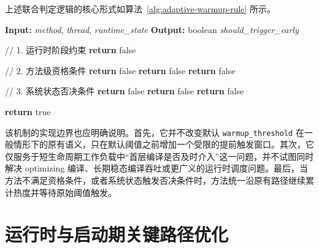 上述联合判定逻辑的核心形式如算法~\ref{alg:adaptive-warmup-rule} 所示。

\begin{algorithm}[htbp]
    \small
    \caption{方法级自适应基线 JIT 提前触发判定机制}
    \label{alg:adaptive-warmup-rule}
    \begin{algorithmic}[1]
        \State \textbf{Input:} \textit{method}, \textit{thread}, \textit{runtime\_state}
        \State \textbf{Output:} boolean \textit{should\_trigger\_early}
        
        \State // 1. 运行时阶段约束
            \State \textbf{return} false
        \EndIf
        
        \State // 2. 方法级资格条件
            \State \textbf{return} false 
        \EndIf
            \State \textbf{return} false 
        \EndIf
            \State \textbf{return} false 
        \EndIf
        
        \State // 3. 系统状态否决条件
            \State \textbf{return} false 
        \EndIf
            \State \textbf{return} false 
        \EndIf
            \State \textbf{return} false 
        \EndIf
        
        \State \textbf{return} true
    \end{algorithmic}
\end{algorithm}

该机制的实现边界也应明确说明。首先，它并不改变默认 \texttt{warmup\_threshold} 在一般情形下的原有语义，只在默认阈值之前增加一个受限的提前触发窗口。其次，它仅服务于短生命周期工作负载中“首层编译是否及时介入”这一问题，并不试图同时解决 optimizing 编译、长期稳态编译吞吐或更广义的运行时调度问题。最后，当方法不满足资格条件，或者系统状态触发否决条件时，方法统一沿原有路径继续累计热度并等待原始阈值触发。

\section{运行时与启动期关键路径优化}

